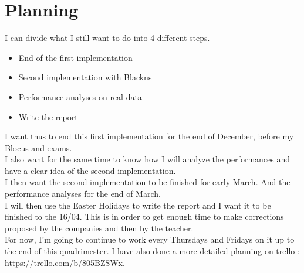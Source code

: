 \documentclass[10pt]{article}
\begin{document}
\section{Planning}
I can divide what I still want to do into 4 different steps.
\begin{itemize}
\item End of the first implementation
\item Second implementation with Blackns
\item Performance analyses on real data
\item Write the report
\end{itemize}

I want thus to end this first implementation for the end of December, before my Blocus and exams. \\
I also want for the same time to know how I will analyze the performances and have a clear idea of the second implementation.\\

I then want the second implementation to be finished for early March. And the performance analyses for the end of March.\\
I will then use the Easter Holidays to write the report and I want it to be finished to the 16/04. This is in order to get enough time to make corrections proposed by the companies and then by the teacher.\\

For now, I'm going to continue to work every Thursdays and Fridays on it up to the end of this quadrimester. I have also done a more detailed planning on trello : \url{https://trello.com/b/805BZSWx}.




\end{document}
